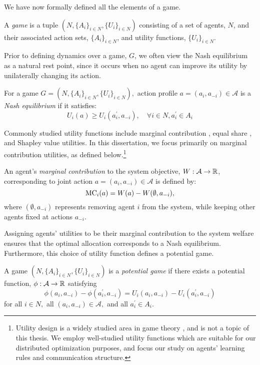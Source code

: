 We have now formally defined all the elements of a game.

\begin{defn}
A {\it game} is a tuple $(N,\{A_i\}_{i\in N}, \{U_i\}_{i\in N})$ consisting of a set of agents, $N$, and their associated action sets, $\{A_i\}_{i\in N}$, and utility functions, $\{U_i\}_{i\in N}$.
\end{defn}

Prior to defining dynamics over a game, $G$, we often view the Nash equilibrium as a natural rest point, since it occurs when no agent can improve its utility by unilaterally changing its action.

\begin{defn}
For a game $G = \left(N,\{A_i\}_{i\in N},\{U_i\}_{i\in N}\right),$ action profile $a = (a_i,a_{-i})\in \mathcal{A}$ is a {\it Nash equilibrium} \cite{add citation} if it satisfies:
$$U_i(a)\geq U_i(a_i^\prime,a_{-i}),\quad \forall i\in N, a_i^\prime\in A_i$$
\end{defn}


Commonly studied utility functions include marginal contribution \cite{Wolpert1999}, equal share \cite{blah}, and Shapley value \cite{blah} utilities. In this dissertation, we focus primarily on marginal contribution utilities, as defined below.\footnote{Utility design is a widely studied area in game theory \cite{blah}, and is not a topic of this thesis. We employ well-studied utility functions which are suitable for our distributed optimization purposes, and focus our study on agents' learning rules and communication structure.} 



\begin{defn}
An agent's {\it marginal contribution}\cite{Wolpert1999} to the system objective, $W:\mathcal{A}\to \mathbb{R}$, corresponding to joint action $a = (a_i,a_{-i})\in \mathcal{A}$ is defined by:
$${\rm MC}_i(a) = W(a) - W(\emptyset,a_{-i}),$$
where $(\emptyset,a_{-i})$ represents removing agent $i$ from the system, while keeping other agents fixed at actions $a_{-i}.$
\end{defn}

Assigning agents' utilities to be their marginal contribution to the system welfare ensures that the optimal allocation corresponds to a Nash equilibrium. Furthermore, this choice of utility function defines a potential game.

\begin{defn}
A game $(N,\{A_i\}_{i\in N}, \{U_i\}_{i\in N})$ is a {\it potential game}\cite{Monderer1996} if there exists a potential function, $\phi:\mathcal{A}\to \mathbb{R}$ satisfying
$$\phi(a_i,a_{-i}) - \phi(a_i^\prime,a_{-i}) = U_i(a_i,a_{-i}) - U_i(a_i^\prime,a_{-i})$$
for all $i\in N,$ all $(a_i,a_{-i})\in \mathcal{A},$ and all $a_i^\prime\in A_i.$
\end{defn}

